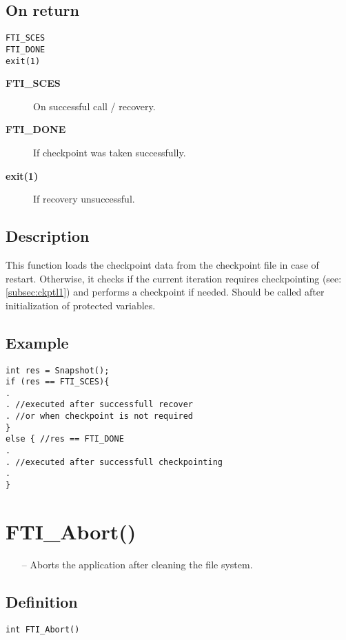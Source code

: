 \documentclass{refrep}
\begin{document}
\subsection*{On return}
\begin{lstlisting}[frame=single]
FTI_SCES
FTI_DONE
exit(1)
\end{lstlisting}
\begin{description}
\item[\textbf{FTI\_SCES}] On successful call / recovery.
\item[\textbf{FTI\_DONE}] If checkpoint was taken successfully.
\item[\textbf{exit(1)}] If recovery unsuccessful.
\end{description}
\subsection*{Description}
This function loads the checkpoint data from the checkpoint file in case of restart. Otherwise, it checks if the current iteration requires checkpointing (see: \ref{subsec:ckptl1}) and performs a checkpoint if needed. Should be called after initialization of protected variables.
\subsection*{Example}
\begin{center}
\begin{lstlisting}[frame=single]
int res = Snapshot();
if (res == FTI_SCES){
.
. //executed after successfull recover
. //or when checkpoint is not required
}
else { //res == FTI_DONE
.
. //executed after successfull checkpointing
. 
}

\end{lstlisting}
\end{center}
\newpage
\section{\asciifamily FTI\_Abort()}\label{sec:abort}
\begin{framed}
\begin{itemize}
\item[--] Aborts the application after cleaning the file system.
\end{itemize}
\end{framed}
\subsection*{Definition}
\begin{lstlisting}[frame=single]
int FTI_Abort()
\end{lstlisting}
\end{document}
